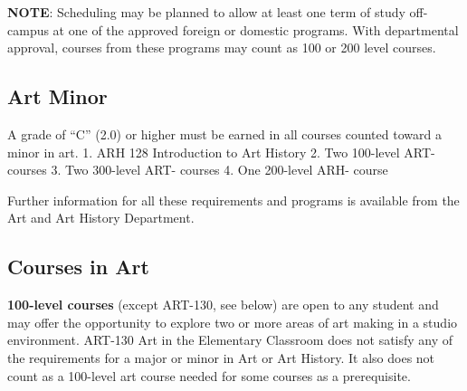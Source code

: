 \documentclass[
  letterpaper,
]{scrbook}
\begin{document}
\textbf{NOTE}: Scheduling may be planned to allow at least one term of
study off-campus at one of the approved foreign or domestic programs.
With departmental approval, courses from these programs may count as 100
or 200 level courses.

\subsection{Art Minor}\label{art-minor}

A grade of ``C'' (2.0) or higher must be earned in all courses counted
toward a minor in art. 1. ARH 128 Introduction to Art History 2. Two
100-level ART- courses 3. Two 300-level ART- courses 4. One 200-level
ARH- course

Further information for all these requirements and programs is available
from the Art and Art History Department.

\subsection{Courses in Art}\label{courses-in-art}

\textbf{100-level courses} (except ART-130, see below) are open to any
student and may offer the opportunity to explore two or more areas of
art making in a studio environment. ART-130 Art in the Elementary
Classroom does not satisfy any of the requirements for a major or minor
in Art or Art History. It also does not count as a 100-level art course
needed for some courses as a prerequisite.
\end{document}
